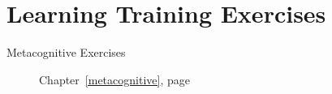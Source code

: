 \documentclass[../main.tex]{subfiles}
\begin{document}
%
\chapter{Learning Training Exercises}
\begin{description}
\item[Metacognitive Exercises] Chapter~\ref{metacognitive}, page~\pageref{metacognitive}
\end{description}
\end{document}
